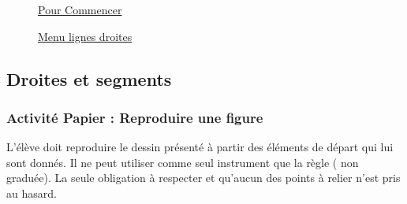 \begin{multicols}{2}

  \begin{figure}[H]
    \centering
    \caption{\hyperref[geo-commencer]{Pour Commencer}}
  \end{figure}

  \begin{figure}[H]
    \centering
    \caption{\href{http://www-irem.univ-paris13.fr/site_spip/IMG/ggb/menu_lignes_droites-3.ggb}{Menu lignes droites}}
  \end{figure}
\end{multicols}

\subsection{Droites et segments}

\subsubsection{Activité Papier : Reproduire une figure}

L’élève doit reproduire le dessin présenté à partir des éléments de départ qui lui sont donnés. Il ne peut utiliser comme seul instrument que la règle ( non graduée). La seule obligation à respecter et qu’aucun des points à relier n’est pris au hasard.


